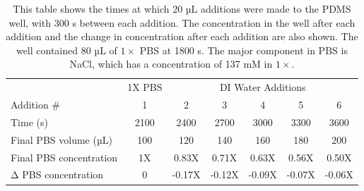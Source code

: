 \documentclass[
  a4paper,
]{scrbook}
\begin{document}
\hypertarget{tbl-salt-conc-series}{}
\begin{longtable}[t]{lcccccc}
\caption{\label{tbl-salt-conc-series}This table shows the times at which 20 µL additions were made to the
PDMS well, with 300 s between each addition. The concentration in the
well after each addition and the change in concentration after each
addition are also shown. The well contained 80 µL of \(1 \times\) PBS at
1800 s. The major component in PBS is NaCl, which has a concentration of
137 mM in \(1 \times\). }\tabularnewline

\toprule
\multicolumn{1}{c}{ } & \multicolumn{1}{c}{1X PBS} & \multicolumn{5}{c}{DI Water Additions} \\
\cmidrule(l{3pt}r{3pt}){2-2} \cmidrule(l{3pt}r{3pt}){3-7}
Addition \# & 1 & 2 & 3 & 4 & 5 & 6\\
\midrule
Time (s) & 2100 & 2400 & 2700 & 3000 & 3300 & 3600\\
Final PBS volume (µL) & 100 & 120 & 140 & 160 & 180 & 200\\
Final PBS concentration & 1X & 0.83X & 0.71X & 0.63X & 0.56X & 0.50X\\
Δ PBS concentration & 0 & -0.17X & -0.12X & -0.09X & -0.07X & -0.06X\\
\bottomrule
\end{longtable}
\end{document}
